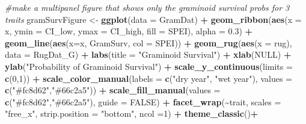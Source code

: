 \documentclass[
]{article}
\newenvironment{Shaded}{\begin{snugshade}}{\end{snugshade}}
\newcommand{\CommentTok}[1]{\textcolor[rgb]{0.56,0.35,0.01}{\textit{#1}}}
\newcommand{\DataTypeTok}[1]{\textcolor[rgb]{0.13,0.29,0.53}{#1}}
\newcommand{\DecValTok}[1]{\textcolor[rgb]{0.00,0.00,0.81}{#1}}
\newcommand{\FloatTok}[1]{\textcolor[rgb]{0.00,0.00,0.81}{#1}}
\newcommand{\KeywordTok}[1]{\textcolor[rgb]{0.13,0.29,0.53}{\textbf{#1}}}
\newcommand{\NormalTok}[1]{#1}
\newcommand{\OperatorTok}[1]{\textcolor[rgb]{0.81,0.36,0.00}{\textbf{#1}}}
\newcommand{\OtherTok}[1]{\textcolor[rgb]{0.56,0.35,0.01}{#1}}
\newcommand{\StringTok}[1]{\textcolor[rgb]{0.31,0.60,0.02}{#1}}
\begin{document}
\begin{Shaded}
\begin{Highlighting}[]
\CommentTok{\#make a multipanel figure that shows only the graminoid survival probs for 3 traits}
\NormalTok{gramSurvFigure \textless{}{-}}\StringTok{ }\KeywordTok{ggplot}\NormalTok{(}\DataTypeTok{data =}\NormalTok{ GramDat) }\OperatorTok{+}
\StringTok{  }\KeywordTok{geom\_ribbon}\NormalTok{(}\KeywordTok{aes}\NormalTok{(}\DataTypeTok{x =}\NormalTok{ x, }\DataTypeTok{ymin =}\NormalTok{ CI\_low, }\DataTypeTok{ymax =}\NormalTok{ CI\_high, }\DataTypeTok{fill =}\NormalTok{ SPEI), }\DataTypeTok{alpha =} \FloatTok{0.3}\NormalTok{) }\OperatorTok{+}
\StringTok{  }\KeywordTok{geom\_line}\NormalTok{(}\KeywordTok{aes}\NormalTok{(}\DataTypeTok{x=}\NormalTok{x, GramSurv, }\DataTypeTok{col =}\NormalTok{ SPEI))  }\OperatorTok{+}\StringTok{ }
\StringTok{  }\KeywordTok{geom\_rug}\NormalTok{(}\KeywordTok{aes}\NormalTok{(}\DataTypeTok{x =}\NormalTok{ rug), }\DataTypeTok{data =}\NormalTok{ RugDat\_G) }\OperatorTok{+}
\StringTok{  }\KeywordTok{labs}\NormalTok{(}\DataTypeTok{title =} \StringTok{"Graminoid Survival"}\NormalTok{) }\OperatorTok{+}
\StringTok{  }\KeywordTok{xlab}\NormalTok{(}\OtherTok{NULL}\NormalTok{) }\OperatorTok{+}
\StringTok{  }\KeywordTok{ylab}\NormalTok{(}\StringTok{"Probability of Graminoid Survival"}\NormalTok{) }\OperatorTok{+}
\StringTok{  }\KeywordTok{scale\_y\_continuous}\NormalTok{(}\DataTypeTok{limits =} \KeywordTok{c}\NormalTok{(}\DecValTok{0}\NormalTok{,}\DecValTok{1}\NormalTok{)) }\OperatorTok{+}
\StringTok{  }\KeywordTok{scale\_color\_manual}\NormalTok{(}\DataTypeTok{labels =} \KeywordTok{c}\NormalTok{(}\StringTok{"dry year"}\NormalTok{, }\StringTok{"wet year"}\NormalTok{), }\DataTypeTok{values =} \KeywordTok{c}\NormalTok{(}\StringTok{"\#fc8d62"}\NormalTok{,}\StringTok{"\#66c2a5"}\NormalTok{)) }\OperatorTok{+}
\StringTok{  }\KeywordTok{scale\_fill\_manual}\NormalTok{(}\DataTypeTok{values =} \KeywordTok{c}\NormalTok{(}\StringTok{"\#fc8d62"}\NormalTok{,}\StringTok{"\#66c2a5"}\NormalTok{), }\DataTypeTok{guide =} \OtherTok{FALSE}\NormalTok{) }\OperatorTok{+}
\StringTok{  }\KeywordTok{facet\_wrap}\NormalTok{(}\OperatorTok{\textasciitilde{}}\NormalTok{trait, }\DataTypeTok{scales =} \StringTok{"free\_x"}\NormalTok{, }\DataTypeTok{strip.position =}  \StringTok{"bottom"}\NormalTok{, }\DataTypeTok{ncol =}\DecValTok{1}\NormalTok{) }\OperatorTok{+}
\StringTok{  }\KeywordTok{theme\_classic}\NormalTok{()}\OperatorTok{+}

\end{Highlighting}
\end{Shaded}
\end{document}
